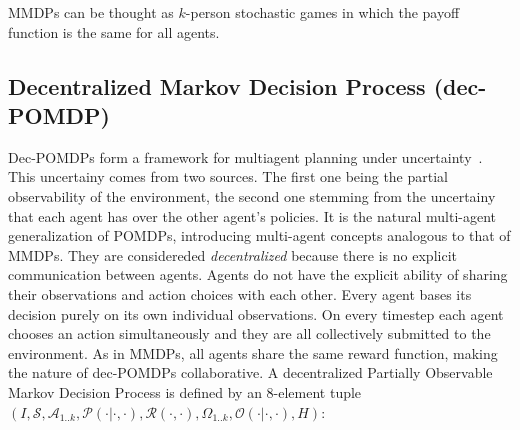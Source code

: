 \documentclass{../main.tex}{}
\begin{document}
MMDPs can be thought as $k$-person stochastic games in which the payoff function is the same for all agents.

\subsection{Decentralized Markov Decision Process (dec-POMDP)}

Dec-POMDPs form a framework for multiagent planning under uncertainty~\citep{Oliehoek2014}. This uncertainy comes from two sources. The first one being the partial observability of the environment, the second one stemming from the uncertainy that each agent has over the other agent's policies. It is the natural multi-agent generalization of POMDPs, introducing multi-agent concepts analogous to that of MMDPs. They are considereded \textit{decentralized} because there is no explicit communication between agents. Agents do not have the explicit ability of sharing their observations and action choices with each other. Every agent bases its decision purely on its own individual observations. On every timestep each agent chooses an action simultaneously and they are all collectively submitted to the environment. As in MMDPs, all agents share the same reward function, making the nature of dec-POMDPs collaborative. A decentralized Partially Observable Markov Decision Process is defined by an 8-element tuple $(I, \mathcal{S}, \mathcal{A}_{1..k}, \mathcal{P}(\cdot | \cdot, \cdot), \mathcal{R}(\cdot, \cdot), \Omega_{1..k}, \mathcal{O(\cdot | \cdot, \cdot)}, H)$:
\end{document}
